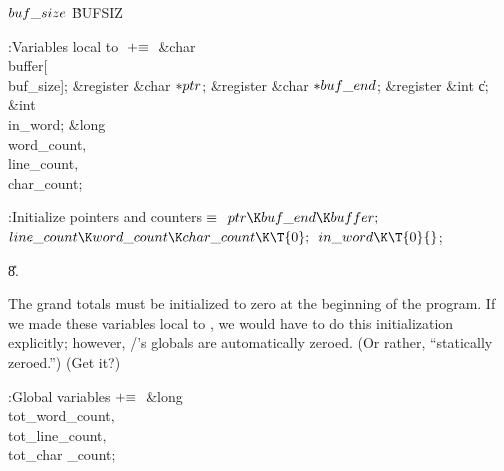\Y\B\4\D$\\{buf\_size}$ \5
\.{BUFSIZ}\par
\Y\B\4:Variables local to \X${}\mathrel+\equiv{}$\6
\&{char} \\{buffer}[\\{buf\_size}];\6
\&{register} \&{char} ${}{*}\\{ptr}{}$;\6
\&{register} \&{char} ${}{*}\\{buf\_end}{}$;\6
\&{register} \&{int} \|c;\6
\&{int} \\{in\_word};\6
\&{long} \\{word\_count}${},{}$ \\{line\_count}${},{}$ \\{char\_count};\par
\fi

\B{}:Initialize pointers and counters\X${}\equiv{}$\6
$\\{ptr}\K\\{buf\_end}\K\\{buffer};{}$\6
${}\\{line\_count}\K\\{word\_count}\K\\{char\_count}\K\T{0};{}$\6
${}\\{in\_word}\K\T{0}{}$;\par
\U8.\fi

The grand totals must be initialized to zero at the beginning of the
program. If we made these variables local to , we would have to
do this initialization explicitly; however, \CEE/'s globals are automatically
zeroed. (Or rather, ``statically zeroed.'') (Get it?)

\Y\B\4:Global variables\X${}\mathrel+\equiv{}$\6
\&{long} \\{tot\_word\_count}${},{}$ \\{tot\_line\_count}${},{}$ \\{tot\_char%
\_count};\par
\fi

